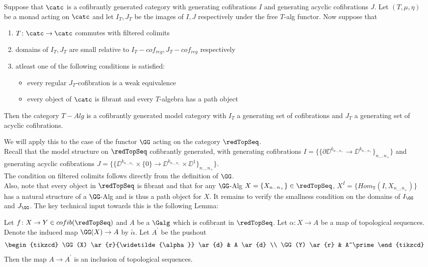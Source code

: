 \documentclass[a4paper,10pt]{amsart}
\begin{document}
\begin{proposition}\label{modprop}
	Suppose that $\catc$ is a cofibrantly generated category with generating cofibrations $I$ and generating acyclic cofibrations $J$. Let $(T,\mu,\eta)$ be a monad acting on $\catc$ and let $I_T, J_T$ be the images of $I,J$ respectively under the free $T$-alg functor. Now suppose that
	\begin{enumerate}
		\item $T \colon \catc \to \catc$ commutes with filtered colimits
		\item domains of $I_T,J_T$ are small relative to $I_T-cof_{reg}, J_T-cof_{reg}$ respectively
		\item atleast one of the following conditions is satisfied: 
			\begin{itemize}
				\item every regular $J_T$-cofibration is a weak equivalence
				\item every object of $\catc$ is fibrant and every $T$-algebra has a path object
			\end{itemize}
	\end{enumerate} 
Then the category $T-Alg$ is a cofibrantly generated model category with $I_T$ a generating set of cofibrations and $J_T$ a generating set of acyclic cofibrations.
\end{proposition}

We will apply this to the case of the functor $\GG$ acting on the category $\redTopSeq$. \\ 
Recall that the model structure on $\redTopSeq$ cofibrantly generated, with generating cofibrations $I=\{\{\partial \DD^{k_{n_-,n_+}} \to \DD^{k_{n_-,n_+}} \}_{n_-,n_+}\}$ and generating acyclic cofibrations $J=\{ \{\DD^{k_{n_-,n_+}}\times \{0\} \to \DD^{k_{n_-,n_+}} \times \DD^1  \}_{n_-,n_+}\}$.\\
 The condition on filtered colimits follows directly from the definition of $\GG$.\\
Also, note that every object in $\redTopSeq$ is fibrant and that for any $\GG$-Alg $X = \{X_{n_-n_+}\} \in \redTopSeq$, $X^I = \{ Hom_{\Top}(I,X_{n_-,n_+}	)\}$ has a natural structure of a $\GG$-Alg and is thus a path object for $X$. It remains to verify the smallness condition on the domains of $I_\GG$ and $J_{\GG}$. The key technical input towards this is the following Lemma:

\begin{lemma}\label{lempush}
Let $f \colon X \to Y \in cofib(\redTopSeq)$ and $A$ be a $\Galg$ which is cofibrant in $\redTopSeq$. Let $\alpha \colon X \to A$ be a map of topological sequences. Denote the induced map $\GG(X) \to A$ by $\widetilde{\alpha}$. Let $A^\prime$ be the pushout
\[
	\begin{tikzcd}
	\GG(X) \ar{r}{\widetilde{\alpha}} \ar{d} & A \ar{d} \\
	\GG(Y) \ar{r} & A^\prime
	\end{tikzcd}
\]
Then the map $A \to A^\prime$ is an inclusion of topological sequences.
\end{lemma}
  
\end{document}
